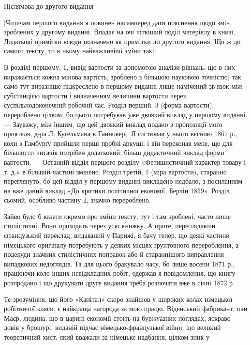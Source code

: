 Післямова до другого видання

[Читачам першого видання я повинен насамперед дати пояснення
щодо змін, зроблених у другому виданні. Впадає на очі
чіткіший поділ матеріялу в книзі. Додаткові примітки всюди
позначено як примітки до другого видання. Що ж до самого тексту,
то в ньому найважливіші зміни такі:

В розділі першому, 1, вивід вартости за допомогою аналізи
рівнань, що в них виражається кожна мінова вартість, зроблено
з більшою науковою точністю; так само тут виразніше підкреслено
в першому виданні лише намічений зв’язок між субстанцією
вартости і визначенням величини вартости через суспільнодоконечний
робочий час. Розділ перший, 3 (форма вартости), перероблено
цілком, бо цього потребував уже двоякий виклад у
першому виданні. — Зауважу, між іншим, що цей двоякий виклад
подано з пропозиції мого приятеля, д-ра Л. Куґельмана в Ганновері.
Я гостював у нього весною 1867 р., коли з Гамбурґу
прийшли перші пробні аркуші, і він переконав мене, що для більшости
читачів потрібен додатковий, більш дидактичний виклад
форми вартости. — Останній відділ першого розділу «Фетишистичний
характер товару і т. д.» в більшій частині змінено. Розділ
третій, 1 (міра вартости), старанно переглянуто, бо цей відділ
у першому виданні викладено недбало, з посиланням на вже даний
виклад «До критики політичної економії, Берлін 1859». Розділ
сьомий, особливо частину 2, значно перероблено.

Зайво було б казати окремо про зміни тексту, тут і там зроблені,
часто лише стилістичні. Вони проходять через усю книжку.
А проте, переглядаючи французький переклад, видаваний у Парижі,
я бачу тепер, що деякі частини німецького оригіналу потребують
у деяких місцях ґрунтовного перероблення, а подекуди
значних стилістичних поправок або й стараннішого виправлення
випадкових недоглядів. Та для цього бракувало часу, бо лише
восени 1871 р., працюючи коло інших невідкладних робіт, одержав
я повідомлення, що книгу розпродано і що друкувати друге
видання треба розпочати вже в січні 1872 р.

Те зрозуміння, що його «Капітал» скоро знайшов у широких
колах німецької робітничої кляси, є найкраща нагорода за мою
працю. Віденський фабрикант, пан Маєр, людина, що в царині
економії стоїть на буржуазних поглядах, яскраво довів у брошурі,
виданій підчас німецько-французької війни, що великий теоретичний
хист, який вважали за німецьке надбання, цілком зник у
\parbreak{}  %
